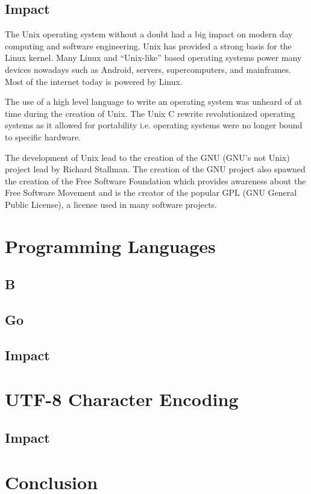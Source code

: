 \documentclass{article}
\begin{document}
\subsection{Impact}
The Unix operating system without a doubt had a big impact on modern day
computing and software engineering. Unix has provided a strong basis for the
Linux kernel. Many Linux and ``Unix-like'' based operating systems power many
devices nowadays such as Android, servers, supercomputers, and mainframes. Most
of the internet today is powered by Linux.

The use of a high level language to write an operating system was unheard of at
time during the creation of Unix. The Unix C rewrite revolutionized operating
systems as it allowed for portability i.e. operating systems were no longer
bound to specific hardware.

The development of Unix lead to the creation of the GNU (GNU's not Unix)
project lead by Richard Stallman. The creation of the GNU project also spawned
the creation of the Free Software Foundation which provides awareness about the
Free Software Movement and is the creator of the popular GPL (GNU General
Public License), a license used in many software projects.


\section{Programming Languages}
\subsection{B}
\subsection{Go}
\subsection{Impact}

\section{UTF-8 Character Encoding}
\subsection{Impact}

\section{Conclusion}



\end{document}
